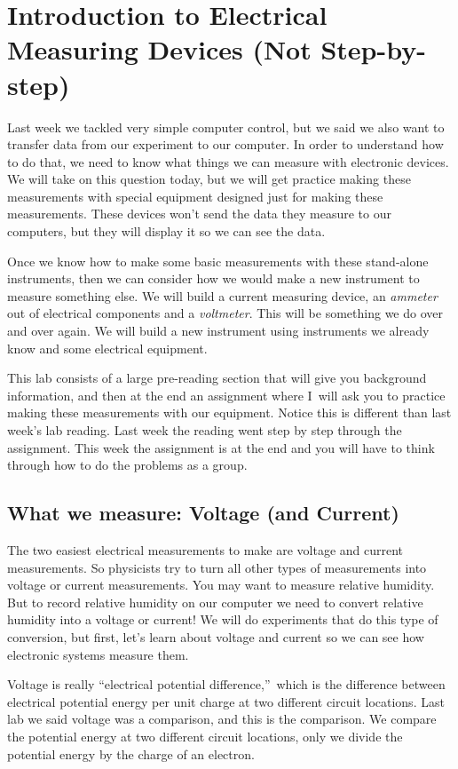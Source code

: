 \chapter{Introduction to Electrical Measuring Devices (Not Step-by-step)}
Last week we tackled very simple computer control, but we said we also want
to transfer data from our experiment to our computer. In order to understand
how to do that, we need to know what things we can measure with electronic
devices. We will take on this question today, but we will get practice
making these measurements with special equipment designed just for making
these measurements. These devices won't send the data they measure to our
computers, but they will display it so we can see the data.

Once we know how to make some basic measurements with these stand-alone
instruments, then we can consider how we would make a new instrument to
measure something else. We will build a current measuring device, an \emph{%
ammeter} out of electrical components and a \emph{voltmeter}. This will be
something we do over and over again. We will build a new instrument using
instruments we already know and some electrical equipment.

This lab consists of a large pre-reading section that will give you
background information, and then at the end an assignment where I\ will ask
you to practice making these measurements with our equipment. Notice this is
different than last week's lab reading. Last week the reading went step by
step through the assignment. This week the assignment is at the end and you
will have to think through how to do the problems as a group.

\section{What we measure: Voltage (and Current)\label{Voltage Measurement
with Meter}}

The two easiest electrical measurements to make are voltage and current
measurements. So physicists try to turn all other types of measurements into
voltage or current measurements. You may want to measure relative humidity.
But to record relative humidity on our computer we need to convert relative
humidity into a voltage or current! We will do experiments that do this type
of conversion, but first, let's learn about voltage and current so we can
see how electronic systems measure them.

Voltage is really \textquotedblleft electrical potential
difference,\textquotedblright\ which is the difference between electrical
potential energy per unit charge at two different circuit locations. Last
lab we said voltage was a comparison, and this is the comparison. We compare
the potential energy at two different circuit locations, only we divide the
potential energy by the charge of an electron.

